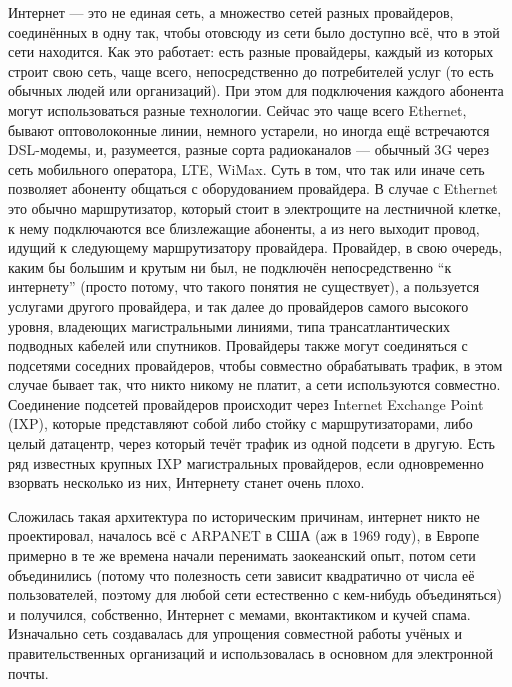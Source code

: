 \documentclass[a5paper]{article}
\begin{document}
Интернет --- это не единая сеть, а множество сетей разных провайдеров, соединённых в одну так, чтобы отовсюду из сети было доступно всё, что в этой сети находится. Как это работает: есть разные провайдеры, каждый из которых строит свою сеть, чаще всего, непосредственно до потребителей услуг (то есть обычных людей или организаций). При этом для подключения каждого абонента могут использоваться разные технологии. Сейчас это чаще всего Ethernet, бывают оптоволоконные линии, немного устарели, но иногда ещё встречаются DSL-модемы, и, разумеется, разные сорта радиоканалов --- обычный 3G через сеть мобильного оператора, LTE, WiMax. Суть в том, что так или иначе сеть позволяет абоненту общаться с оборудованием провайдера. В случае с Ethernet это обычно маршрутизатор, который стоит в электрощите на лестничной клетке, к нему подключаются все близлежащие абоненты, а из него выходит провод, идущий к следующему маршрутизатору провайдера. Провайдер, в свою очередь, каким бы большим и крутым ни был, не подключён непосредственно ``к интернету'' (просто потому, что такого понятия не существует), а пользуется услугами другого провайдера, и так далее до провайдеров самого высокого уровня, владеющих магистральными линиями, типа трансатлантических подводных кабелей или спутников. Провайдеры также могут соединяться с подсетями соседних провайдеров, чтобы совместно обрабатывать трафик, в этом случае бывает так, что никто никому не платит, а сети используются совместно. Соединение подсетей провайдеров происходит через Internet Exchange Point (IXP), которые представляют собой либо стойку с маршрутизаторами, либо целый датацентр, через который течёт трафик из одной подсети в другую. Есть ряд известных крупных IXP магистральных провайдеров, если одновременно взорвать несколько из них, Интернету станет очень плохо. 

Сложилась такая архитектура по историческим причинам, интернет никто не проектировал, началось всё с ARPANET в США (аж в 1969 году), в Европе примерно в те же времена начали перенимать заокеанский опыт, потом сети объединились (потому что полезность сети зависит квадратично от числа её пользователей, поэтому для любой сети естественно с кем-нибудь объединяться) и получился, собственно, Интернет с мемами, вконтактиком и кучей спама. Изначально сеть создавалась для упрощения совместной работы учёных и правительственных организаций и использовалась в основном для электронной почты.
\end{document}
